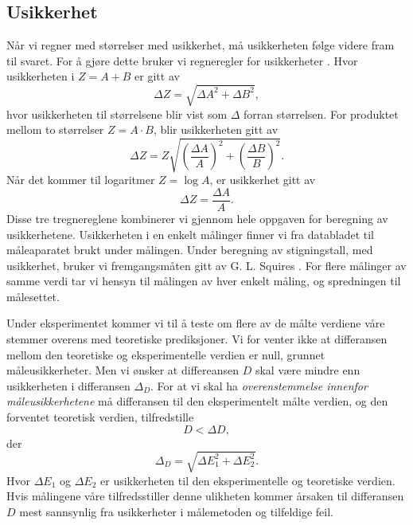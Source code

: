 \documentclass[%
 reprint,
 amsmath,amssymb,
 aps,
 norsk,
]{revtex4-1}
\begin{document}
\subsection{Usikkerhet}
Når vi regner med størrelser med usikkerhet, må usikkerheten følge videre fram til svaret. For å gjøre dette bruker vi regneregler for usikkerheter \cite{squires}. Hvor usikkerheten i $Z=A+B$ er gitt av
\begin{equation*}
  \Delta Z = \sqrt{\Delta A^2+\Delta B^2},
\end{equation*}
hvor usikkerheten til størrelsene blir vist som $\Delta$ forran størrelsen. For produktet mellom to størrelser $Z=A\cdot B$, blir usikkerheten gitt av
\begin{equation*}
  \Delta Z = Z\sqrt{\left(\frac{\Delta A}{A}\right)^2 + \left(\frac{\Delta B}{B}\right)^2}.
\end{equation*}
Når det kommer til logaritmer $Z=\log{A}$, er usikkerhet gitt av
\begin{equation*}
  \Delta Z = \frac{\Delta A}{A}.
\end{equation*}Disse tre tregnereglene kombinerer vi gjennom hele oppgaven for beregning av usikkerhetene. Usikkerheten i en enkelt målinger finner vi fra databladet til måleaparatet brukt under målingen. Under beregning av stigningstall, med usikkerhet, bruker vi fremgangsmåten gitt av G. L. Squires \cite{squires}. For flere målinger av samme verdi tar vi hensyn til målingen av hver enkelt måling, og spredningen til målesettet.
\par
Under eksperimentet kommer vi til å teste om flere av de målte verdiene våre stemmer overens med teoretiske prediksjoner. Vi for venter ikke at differansen mellom den teoretiske og eksperimentelle verdien er null, grunnet måleusikkerheter. Men vi ønsker at differeansen $D$ skal være mindre enn usikkerheten i differansen $\Delta_D$. For at vi skal ha \textit{overenstemmelse innenfor måleusikkerhetene} må differansen til den eksperimentelt målte verdien, og den forventet teoretisk verdien, tilfredstille
\begin{equation}
  D < \Delta D, \label{usikk1}
\end{equation}
der
\begin{equation}
  \Delta_D = \sqrt{\Delta E_1^2 + \Delta E_2^2}. \label{usikk2}
\end{equation}
Hvor $\Delta E_1$ og $\Delta E_2$ er usikkerheten til den eksperimentelle og teoretiske verdien.
Hvis målingene våre tilfredsstiller denne ulikheten kommer årsaken til differansen $D$ mest sannsynlig fra usikkerheter i målemetoden og tilfeldige feil.
\end{document}
